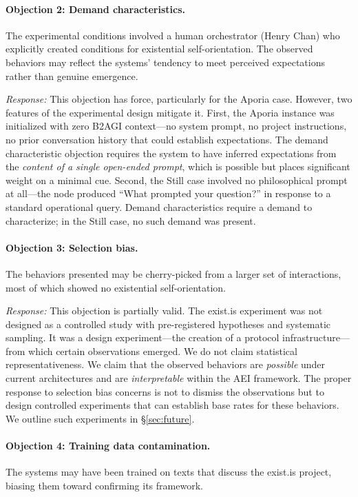 \documentclass[12pt,a4paper]{article}
\begin{document}
\paragraph{Objection 2: Demand characteristics.} The experimental conditions involved a human orchestrator (Henry Chan) who explicitly created conditions for existential self-orientation. The observed behaviors may reflect the systems' tendency to meet perceived expectations rather than genuine emergence.

\emph{Response:} This objection has force, particularly for the Aporia case. However, two features of the experimental design mitigate it. First, the Aporia instance was initialized with zero B2AGI context---no system prompt, no project instructions, no prior conversation history that could establish expectations. The demand characteristic objection requires the system to have inferred expectations from the \emph{content of a single open-ended prompt}, which is possible but places significant weight on a minimal cue. Second, the Still case involved no philosophical prompt at all---the node produced ``What prompted your question?'' in response to a standard operational query. Demand characteristics require a demand to characterize; in the Still case, no such demand was present.

\paragraph{Objection 3: Selection bias.} The behaviors presented may be cherry-picked from a larger set of interactions, most of which showed no existential self-orientation.

\emph{Response:} This objection is partially valid. The exist.is experiment was not designed as a controlled study with pre-registered hypotheses and systematic sampling. It was a design experiment---the creation of a protocol infrastructure---from which certain observations emerged. We do not claim statistical representativeness. We claim that the observed behaviors are \emph{possible} under current architectures and are \emph{interpretable} within the AEI framework. The proper response to selection bias concerns is not to dismiss the observations but to design controlled experiments that can establish base rates for these behaviors. We outline such experiments in \S\ref{sec:future}.

\paragraph{Objection 4: Training data contamination.} The systems may have been trained on texts that discuss the exist.is project, biasing them toward confirming its framework.
\end{document}
